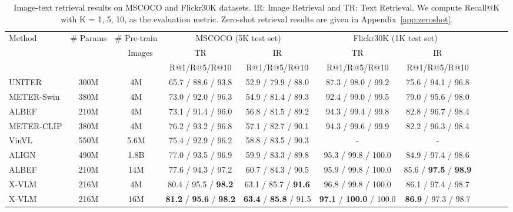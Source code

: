 \documentclass[nohyperref]{article}
\theoremstyle{plain}
\theoremstyle{definition}
\theoremstyle{remark}
\begin{document}
\begin{table*}[!t]
	\caption
	{
		Image-text retrieval results on MSCOCO and Flickr30K datasets. IR: Image Retrieval and TR: Text Retrieval. We compute Recall@K with K = 1, 5, 10, as the evaluation metric. Zero-shot retrieval results are given in Appendix~\ref{app:zeroshot}. 
	}
	\label{tbl:retrieval}
    \small
	\centering	
\begin{tabular}	{l  c c |  c  c | c  c  c  c  c  c }
		\toprule	 	
	 \multirow{2}{*}{Method} & \multirow{2}{*}{\# Params} & \# Pre-train & \multicolumn{2}{c|}{MSCOCO (5K test set)} & \multicolumn{2}{c}{Flickr30K (1K test set)} \\
	 & & ~~Images &  TR & IR & TR & IR\\
	 \midrule
	& & & R@1/R@5/R@10 & R@1/R@5/R@10 & R@1/R@5/R@10 & R@1/R@5/R@10\\
	UNITER & 300M & 4M & 65.7 / 88.6 / 93.8 & 52.9 / 79.9 / 88.0 & 87.3 / 98.0 / 99.2 & 75.6 / 94.1 / 96.8 \\
    METER-Swin & 380M & 4M & 73.0 / 92.0 / 96.3 & 54.9 / 81.4 / 89.3 & 92.4 / 99.0 / 99.5 & 79.0 / 95.6 / 98.0 \\
	ALBEF & 210M & 4M & 73.1 / 91.4 / 96.0 & 56.8 / 81.5 / 89.2 & 94.3 / 99.4 / 99.8  & 82.8 / 96.7 / 98.4 \\
    METER-CLIP & 380M & 4M & 76.2 / 93.2 / 96.8 & 57.1 / 82.7 / 90.1 & 94.3 / 99.6 / 99.9 & 82.2 / 96.3 / 98.4 \\ 
	VinVL & 550M & 5.6M & 75.4 / 92.9 / 96.2 & 58.8 / 83.5 / 90.3 & -  & - \\
	ALIGN & 490M & 1.8B & 77.0 / 93.5 / 96.9 & 59.9 / 83.3 / 89.8 & 95.3 / 99.8 / 100.0 & 84.9 / 97.4 / 98.6 \\
	ALBEF & 210M & 14M & 77.6 / 94.3 / 97.2 & 60.7 / 84.3 / 90.5 & 95.9 / 99.8 / 100.0  & 85.6 / \textbf{97.5} / \textbf{98.9} \\
	\midrule
	X-VLM & 216M & 4M & 80.4 / 95.5 / \textbf{98.2} & 63.1 / 85.7 / \textbf{91.6} & 96.8 / 99.8 / 100.0 & 86.1 / 97.4 / 98.7 \\
	X-VLM & 216M & 16M & \textbf{81.2} / \textbf{95.6} / \textbf{98.2} & \textbf{63.4} / \textbf{85.8} / 91.5 & \textbf{97.1} / \textbf{100.0} / 100.0 & \textbf{86.9} / 97.3 / 98.7 \\
		\bottomrule
	\end{tabular}
\end{table*}		
\end{document}
